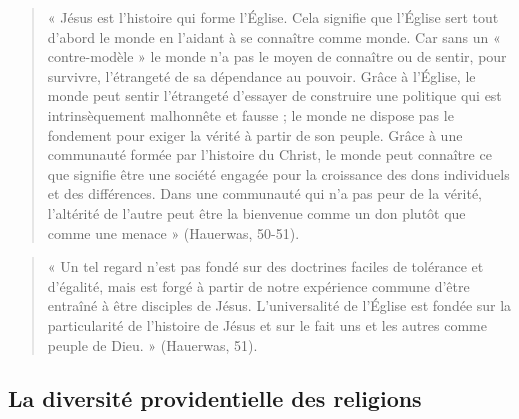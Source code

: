 \begin{quote}
    « Jésus est l’histoire qui forme l’Église. Cela signifie que l’Église sert tout d’abord le monde en
l’aidant à se connaître comme monde. Car sans un « contre-modèle » le monde n’a pas le moyen de
connaître ou de sentir, pour survivre, l’étrangeté de sa dépendance au pouvoir. Grâce à l’Église, le
monde peut sentir l’étrangeté d’essayer de construire une politique qui est intrinsèquement malhonnête
et fausse ; le monde ne dispose pas le fondement pour exiger la vérité à partir de son peuple. Grâce à
une communauté formée par l’histoire du Christ, le monde peut connaître ce que signifie être une
société engagée pour la croissance des dons individuels et des différences. Dans une communauté qui
n’a pas peur de la vérité, l’altérité de l’autre peut être la bienvenue comme un don plutôt que comme
une menace » (Hauerwas, 50-51).
\end{quote}
\begin{quote}
« Un tel regard n’est pas fondé sur des doctrines faciles de tolérance et d’égalité, mais est forgé à partir
de notre expérience commune d’être entraîné à être disciples de Jésus. L’universalité de l’Église est
fondée sur la particularité de l’histoire de Jésus et sur le fait uns et les autres comme peuple de Dieu. » (Hauerwas, 51).
\end{quote}
\subsection{La diversité providentielle des religions}  